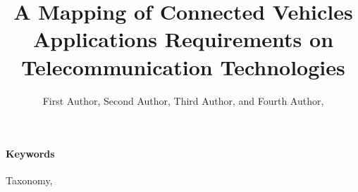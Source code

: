 \documentclass[preprint,authoryear,10pt,a4paper]{elsarticle}
\title{A Mapping of Connected Vehicles Applications Requirements on Telecommunication Technologies}
\author{First Author, Second  Author,  Third  Author, and Fourth  Author,
}
\begin{document}
\maketitle





\paragraph{Keywords} Taxonomy,  





%










\appendix




\end{document}
